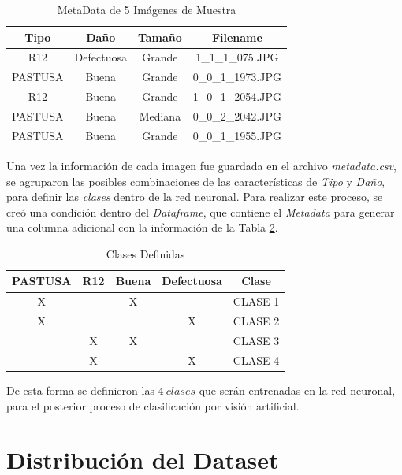 	\begin{table}[ht]
		\centering
		\begin{tabular}{|c|c|c|c|}
			\hline
			Tipo & Daño & Tamaño & Filename \\
			\hline
			R12 & Defectuosa & Grande & 1\_1\_1\_075.JPG \\
			\hline
			PASTUSA & Buena & Grande & 0\_0\_1\_1973.JPG \\
			\hline
			R12 & Buena & Grande & 1\_0\_1\_2054.JPG \\
			\hline
			PASTUSA & Buena & Mediana & 0\_0\_2\_2042.JPG \\
			\hline
			PASTUSA & Buena & Grande & 0\_0\_1\_1955.JPG \\
			\hline
		\end{tabular}	
		\caption{MetaData de 5 Imágenes de Muestra}
		\label{table:metadata}
	\end{table}


	Una vez la información de cada imagen fue guardada en el archivo \textit{metadata.csv}, se agruparon las posibles combinaciones de las características de \textit{Tipo} y \textit{Daño}, para definir las \textit{clases} dentro de la red neuronal. Para realizar este proceso, se creó una condición dentro del \textit{Dataframe}, que contiene el \textit{Metadata} para generar una columna adicional con la información de la Tabla \ref{table:Clases}.	
	
	\begin{table}[ht]
		\centering
		\begin{tabular}{|c|c|c|c|c|}
			\hline
			PASTUSA & R12 & Buena & Defectuosa & Clase \\
			\hline
			X &  & X &  & CLASE 1 \\
			\hline
			X &  &  & X & CLASE 2 \\
			\hline
			& X & X &  & CLASE 3 \\
			\hline
			& X &  & X & CLASE 4 \\
			\hline
		\end{tabular}	
		\caption{Clases Definidas}
		\label{table:Clases}
	\end{table}	

De esta forma se definieron las $4 \ clases$ que serán entrenadas en la red neuronal, para el posterior proceso de clasificación por visión artificial. 


\newpage
\section{Distribución del Dataset}
	  
